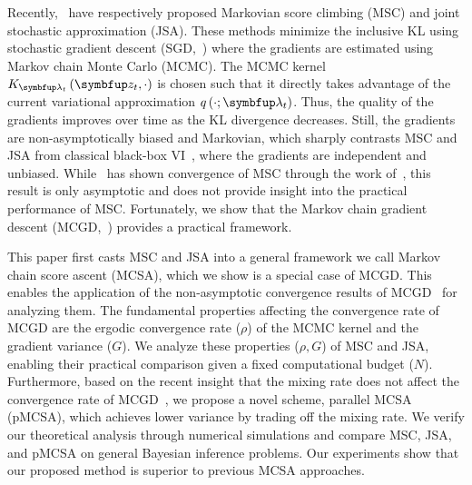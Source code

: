 Recently,~\citet{NEURIPS2020_b2070693,pmlr-v124-ou20a} have respectively proposed Markovian score climbing (MSC) and joint stochastic approximation (JSA).
These methods minimize the inclusive KL using stochastic gradient descent (SGD,~\citealt{robbins_stochastic_1951}) where the gradients are estimated using Markov chain Monte Carlo (MCMC).
The MCMC kernel \(K_{\vlambda_t}\left(\vz_t, \cdot\right)\) is chosen such that it directly takes advantage of the current variational approximation \(q\left(\cdot; \vlambda_t\right)\).
Thus, the quality of the gradients improves over time as the KL divergence decreases.
Still, the gradients are non-asymptotically biased and Markovian, which sharply contrasts MSC and JSA from classical black-box VI~\citep{pmlr-v33-ranganath14, JMLR:v18:16-107}, where the gradients are independent and unbiased.
While~\citet{NEURIPS2020_b2070693} has shown convergence of MSC through the work of~\citet{gu_stochastic_1998}, this result is only asymptotic and does not provide insight into the practical performance of MSC.
Fortunately, we show that the Markov chain gradient descent (MCGD,~\citealt{duchi_ergodic_2012, NEURIPS2018_1371bcce, pmlr-v99-karimi19a, doan_convergence_2020}) provides a practical framework.

This paper first casts MSC and JSA into a general framework we call Markov chain score ascent (MCSA), which we show is a special case of MCGD.
This enables the application of the non-asymptotic convergence results of MCGD~\citep{duchi_ergodic_2012, NEURIPS2018_1371bcce, pmlr-v99-karimi19a, doan_finitetime_2020, doan_convergence_2020, Xiong_Xu_Liang_Zhang_2021, debavelaere_convergence_2021} for analyzing them.
The fundamental properties affecting the convergence rate of MCGD are the ergodic convergence rate (\(\rho\)) of the MCMC kernel and the gradient variance (\(G\)).
We analyze these properties (\(\rho, G\)) of MSC and JSA, enabling their practical comparison given a fixed computational budget (\(N\)).
Furthermore, based on the recent insight that the mixing rate does not affect the convergence rate of MCGD~\citet{doan_convergence_2020,doan_finitetime_2020}, we propose a novel scheme, parallel MCSA (pMCSA), which achieves lower variance by trading off the mixing rate.
We verify our theoretical analysis through numerical simulations and compare MSC, JSA, and pMCSA on general Bayesian inference problems.
Our experiments show that our proposed method is superior to previous MCSA approaches.

